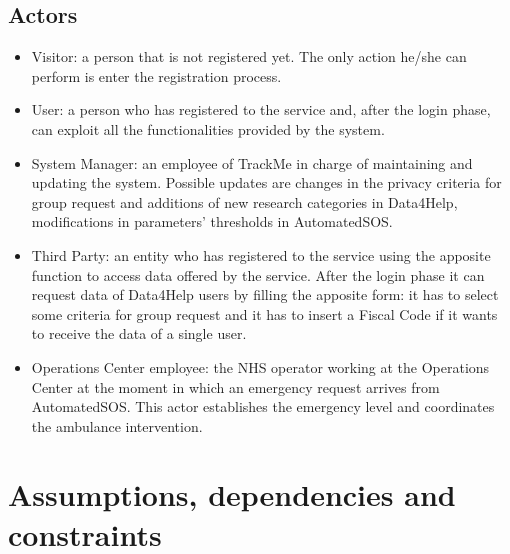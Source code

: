     \subsection{Actors}
    \begin{itemize}
        \item Visitor: a person that is not registered yet. The only action he/she can perform is enter the registration process.
        \item User: a person who has registered to the service and, after the login phase, can exploit all the functionalities provided by the system.
        \item System Manager: an employee of TrackMe in charge of maintaining and updating the system.
        Possible updates are changes in the privacy criteria for group request and additions of new research categories in Data4Help, modifications in parameters' thresholds in AutomatedSOS.
        \item Third Party: an entity who has registered to the service using the apposite function to access data offered by the service.
        After the login phase it can request data of Data4Help users by filling the apposite form: it has to select some criteria for group request and it has to insert a Fiscal Code if it wants to receive the data of a single user. 
        \item Operations Center employee: the NHS operator working at the Operations Center at the moment in which an emergency request arrives from AutomatedSOS. This actor establishes the emergency level and coordinates the ambulance intervention.  
    \end{itemize}
    
\section{Assumptions, dependencies and constraints}

